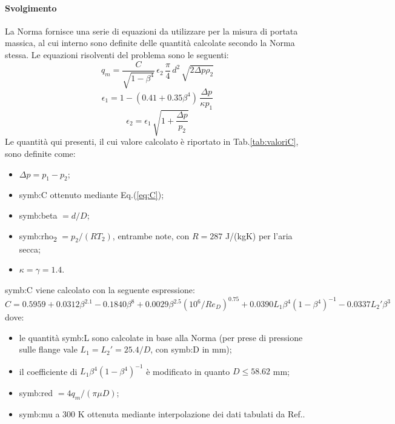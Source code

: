 \paragraph{Svolgimento}
La Norma fornisce una serie di equazioni da utilizzare per la misura di portata massica, al cui interno sono definite delle quantità calcolate secondo la Norma stessa. Le equazioni risolventi del problema sono le seguenti:
\begin{equation}
	q_m=\frac{C}{\sqrt{1-\beta^4}}\, \epsilon_2 \,\frac{\pi}{4} \, d^2 \, \sqrt{2\Delta p \rho_2} \label{eq:portatamassica}
\end{equation}
\begin{equation}
	\epsilon_1= 1 - (0.41+0.35\beta^4) \, \frac{\Delta p}{\kappa p_1} \label{eq:epsilon1}
\end{equation}
\begin{equation}
	\epsilon_2=\epsilon_1 \, \sqrt{1+\frac{\Delta p}{p_2}} \label{eq:epsilon2}
\end{equation}
Le quantità qui presenti, il cui valore calcolato è riportato in Tab.\ref{tab:valoriC}, sono definite come:
\begin{itemize}
	\item $\Delta p = p_1-p_2$;
	\item \gls{symb:C} ottenuto mediante Eq.(\ref{eq:C});
	\item \gls{symb:beta} $ = d/D$;
	\item \gls{symb:rho}\textsubscript{2} $= p_2 / (RT_2) $, entrambe note, con $ R = 287 $ J/(kgK) per l'aria secca;
	\item $\kappa = \gamma = 1.4 $.
\end{itemize}
\gls{symb:C} viene calcolato con la seguente espressione:
\begin{equation}
	C=0.5959+0.0312\beta^{2.1}-0.1840\beta^8+0.0029\beta^{2.5} (10^6/Re_D)^{0.75}+0.0390L_1\beta^4(1-\beta^4)^{-1}-0.0337L_2'\beta^3 \label{eq:C}
\end{equation}
dove:
\begin{itemize}
	\item le quantità \gls{symb:L} sono calcolate in base alla Norma (per prese di pressione sulle flange vale $L_1=L_2'=25.4/D$, con \gls{symb:D} in mm);
	\item il coefficiente di $L_1\beta^4(1-\beta^4)^{-1}$ è modificato in quanto $D\leqslant58.62$ mm;
	\item \gls{symb:red} $=4q_m/(\pi \mu D)$;
	\item \gls{symb:mu} a 300 K ottenuta mediante interpolazione dei dati tabulati da Ref.\cite{Cengel}. 
\end{itemize} 
